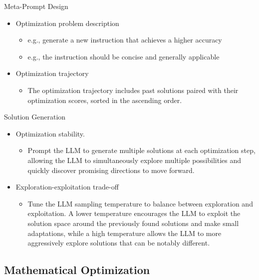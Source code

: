 \documentclass[aspectratio=1610,xcolor={dvipsnames},hyperref={colorlinks,unicode,linkcolor=violet,anchorcolor=BlueViolet,citecolor=YellowOrange,filecolor=black,urlcolor=Aquamarine}]{beamer}
\begin{document}
\begin{frame}[label={sec:org2421be3}]{Meta-Prompt Design}
\begin{itemize}
\item Optimization problem description
\begin{itemize}
\item e.g., generate a new instruction that achieves a higher accuracy
\item e.g., the instruction should be concise and generally applicable
\end{itemize}
\item Optimization trajectory
\begin{itemize}
\item The optimization trajectory includes past solutions paired with their optimization scores, sorted in the \alert{ascending} order.
\end{itemize}
\end{itemize}
\end{frame}
\begin{frame}[label={sec:orga371058}]{Solution Generation}
\begin{itemize}
\item Optimization stability.
\begin{itemize}
\item Prompt the LLM to generate multiple solutions at each optimization step, allowing the LLM to simultaneously explore multiple possibilities and quickly discover promising directions to move forward.
\end{itemize}
\item Exploration-exploitation trade-off
\begin{itemize}
\item Tune the LLM sampling temperature to balance between exploration and exploitation. A lower temperature encourages the LLM to exploit the solution space around the previously found solutions and make small adaptations, while a high temperature allows the LLM to more aggressively explore solutions that can be notably different.
\end{itemize}
\end{itemize}
\end{frame}
\subsection{Mathematical Optimization}
\label{sec:org4a75fc6}
\end{document}
